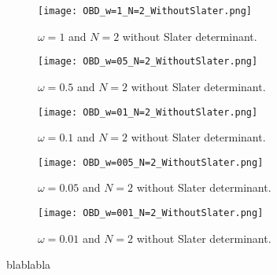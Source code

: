 \documentclass[english, a4paper]{article}
\begin{document}
\begin{figure}[H]
\begin{center}

\begin{subfigure}{.4\textwidth}
  \centering
  \texttt{[image: OBD\_w=1\_N=2\_WithoutSlater.png]}
  \caption{$\omega = 1$ and $N = 2$ without Slater determinant.}
  \label{fig:NAVN1}
\end{subfigure}
\begin{subfigure}{.4\textwidth}
  \centering
  \texttt{[image: OBD\_w=05\_N=2\_WithoutSlater.png]}
  \caption{$\omega = 0.5$ and $N = 2$ without Slater determinant.}
  \label{fig:NAVN2}
\end{subfigure}
\vspace{1cm}
\begin{subfigure}{.4\textwidth}
  \centering
  \texttt{[image: OBD\_w=01\_N=2\_WithoutSlater.png]}
  \caption{$\omega = 0.1$ and $N = 2$ without Slater determinant.}
  \label{fig:NAVN3}
\end{subfigure}
   \begin{subfigure}{.4\textwidth}
  \centering
  \texttt{[image: OBD\_w=005\_N=2\_WithoutSlater.png]}
  \caption{$\omega = 0.05$ and $N = 2$ without Slater determinant.}
  \label{fig:NAVN4}
\end{subfigure}
\vspace{1cm}
\begin{subfigure}{.4\textwidth}
  \centering
  \texttt{[image: OBD\_w=001\_N=2\_WithoutSlater.png]}
  \caption{$\omega = 0.01$ and $N = 2$ without Slater determinant.}
  \label{fig:NAVN5}
\end{subfigure}
    \label{WithoutSlater}
  \end{center}
  \caption{blablabla}
\end{figure}
\end{document}
